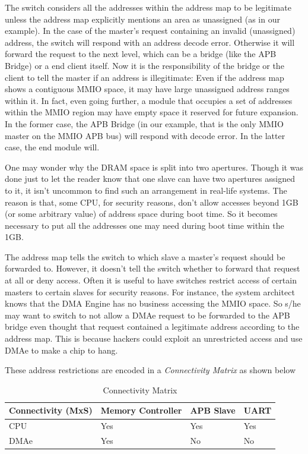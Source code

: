 The switch considers all the addresses within the address map to be legitimate unless the address map explicitly mentions an area as unassigned (as in our example). In the case of the master's request containing an invalid (unassigned) address, the switch will respond with an address decode error. Otherwise it will forward the request to the next level, which can be a bridge (like the APB Bridge) or a end client itself. Now it is the responsibility of the bridge or the client to tell the master if an address is illegitimate: Even if the address map shows a contiguous MMIO space, it may have large unassigned address ranges within it. In fact, even going further, a module that occupies a set of addresses within the MMIO region may have empty space it reserved for future expansion. In the former case, the APB Bridge (in our example, that is the only MMIO master on the MMIO APB bus) will respond with decode error. In the latter case, the end module will. 

One may wonder why the DRAM space is split into two apertures. Though it was done just to let the reader know that one slave can have two apertures assigned to it, it isn't uncommon to find such an arrangement in real-life systems. The reason is that, some CPU, for security reasons, don't allow accesses beyond 1GB (or some arbitrary value) of address space during boot time. So it becomes necessary to put all the addresses one may need during boot time within the 1GB.

The address map tells the switch to which slave a master's request should be forwarded to. However, it doesn't tell the switch whether to forward that request at all or deny access. Often it is useful to have switches restrict access of certain masters to certain slaves for security reasons. For instance, the system architect knows that the DMA Engine has no business accessing the MMIO space. So s/he may want to switch to not allow a DMAe request to be forwarded to the APB bridge even thought that request contained a legitimate address according to the address map. This is because hackers could exploit an unrestricted access and use DMAe to make a chip to hang.

These address restrictions are encoded in a \emph{Connectivity Matrix} as shown below

	\begin{table}[h]
	\begin{tabular}{l l l l}
	\toprule
	Connectivity (MxS) & Memory Controller & APB Slave & UART\\
	\midrule
	CPU & {\color{green} Yes} & {\color{green} Yes} & {\color{green} Yes}\\
	DMAe & {\color{green} Yes} & {\color{red} No} & {\color{red} No}\\
	\bottomrule
	\end{tabular}
	\caption{Connectivity Matrix}
	\end{table}
	


